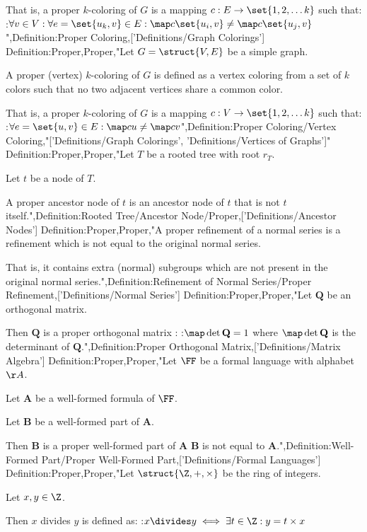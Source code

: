 That is, a proper $k$-coloring of $G$ is a mapping $c: E \to \set {1, 2, \ldots k}$ such that:
:$\forall v \in V: \forall e = \set {u_k, v} \in E: \map c {\set {u_i, v} } \ne \map c {\set {u_j, v} }$
",Definition:Proper Coloring,['Definitions/Graph Colorings']
Definition:Proper,Proper,"Let $G = \struct {V, E}$ be a simple graph.


A proper (vertex) $k$-coloring of $G$ is defined as a vertex coloring from a set of $k$ colors such that no two adjacent vertices share a common color.

That is, a proper $k$-coloring of $G$ is a mapping $c: V \to \set {1, 2, \ldots k}$ such that:
:$\forall e = \set {u, v} \in E: \map c u \ne \map c v$",Definition:Proper Coloring/Vertex Coloring,"['Definitions/Graph Colorings', 'Definitions/Vertices of Graphs']"
Definition:Proper,Proper,"Let $T$ be a rooted tree with root $r_T$.

Let $t$ be a node of $T$.


A proper ancestor node of $t$ is an ancestor node of $t$ that is not $t$ itself.",Definition:Rooted Tree/Ancestor Node/Proper,['Definitions/Ancestor Nodes']
Definition:Proper,Proper,"A proper refinement of a normal series is a refinement which is not equal to the original normal series.


That is, it contains extra (normal) subgroups which are not present in the original normal series.",Definition:Refinement of Normal Series/Proper Refinement,['Definitions/Normal Series']
Definition:Proper,Proper,"Let $\mathbf Q$ be an orthogonal matrix.


Then $\mathbf Q$ is a proper orthogonal matrix :
:$\map \det {\mathbf Q} = 1$
where $\map \det {\mathbf Q}$ is the determinant of $\mathbf Q$.",Definition:Proper Orthogonal Matrix,['Definitions/Matrix Algebra']
Definition:Proper,Proper,"Let $\FF$ be a formal language with alphabet $\AA$.

Let $\mathbf A$ be a well-formed formula of $\FF$.

Let $\mathbf B$ be a well-formed part of $\mathbf A$.


Then $\mathbf B$ is a proper well-formed part of $\mathbf A$  $\mathbf B$ is not equal to $\mathbf A$.",Definition:Well-Formed Part/Proper Well-Formed Part,['Definitions/Formal Languages']
Definition:Proper,Proper,"Let $\struct {\Z, +, \times}$ be the ring of integers.

Let $x, y \in \Z$.


Then $x$ divides $y$ is defined as:
:$x \divides y \iff \exists t \in \Z: y = t \times x$


